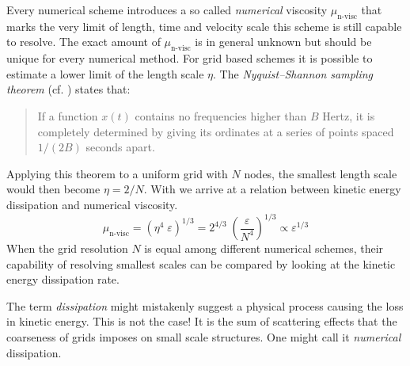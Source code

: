 Every numerical scheme introduces a so called \emph{numerical} viscosity
$\mu_{\text{n-visc}}$ that marks the very limit of length, time and velocity
scale this scheme is still capable to resolve. The exact amount of
$\mu_{\text{n-visc}}$ is in general unknown but should be unique for every
numerical method. For grid based schemes it is possible to estimate a 
lower limit of the length scale $\eta$. The \emph{Nyquist–Shannon sampling
theorem} (cf. \cite{shannon1949communication}) states that:
\begin{quote}
If a function $x(t)$ contains no frequencies higher than $B$ Hertz, it is
completely determined by giving its ordinates at a series of points spaced
$1/(2B)$ seconds apart.
\end{quote}
Applying this theorem to a uniform grid with $N$ nodes, the smallest length
scale would then become $\eta = 2/N$. With  we arrive at
a relation between kinetic energy dissipation and numerical viscosity.
\begin{equation}
\label{eqn:relation-ekin-diss-numerical-visc}
    \mu_{\text{n-visc}} = (\eta^4 \; \varepsilon)^{1/3} 
        = 2^{4/3}\;\left(\frac{\varepsilon}{N^4}\right)^{1/3}
        \propto \varepsilon^{1/3}
\end{equation}
When the grid resolution $N$ is equal among different numerical schemes,
their capability of resolving smallest scales can be compared by looking at the
kinetic energy dissipation rate.

\remark The term \emph{dissipation} might mistakenly suggest a physical process
causing the loss in kinetic energy. This is not the case! It is the sum of
scattering effects that the coarseness of grids imposes on small scale
structures. One might call it \emph{numerical} dissipation.

